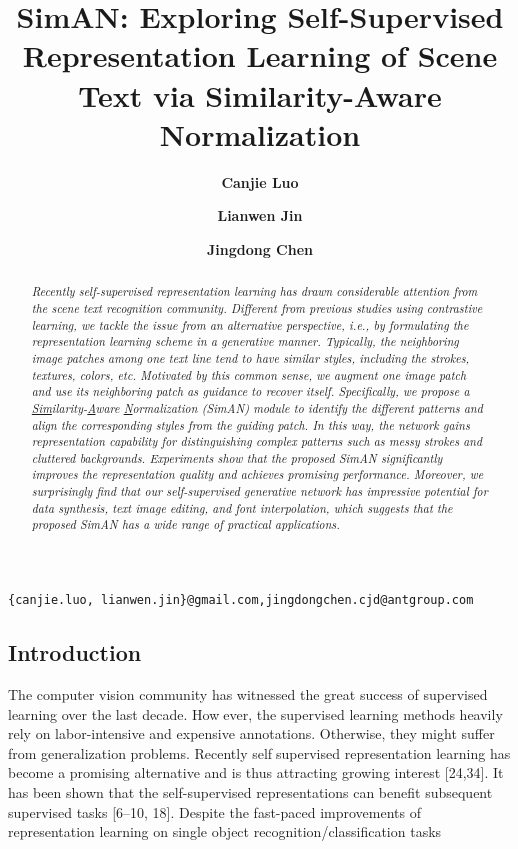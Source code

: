 \documentclass{article}
\title{\Large\textbf{SimAN: Exploring Self-Supervised Representation Learning of Scene Text
via Similarity-Aware Normalization}\\

}
\author[1]{\textbf{ Canjie Luo}}
\author[1,2,*]{\textbf{ Lianwen Jin} }
\author[3]{\textbf{Jingdong Chen}}
\affil[1]{South China University of Technology}
\affil[2]{Peng Cheng Laboratory}
\affil[3]{Ant Group}
\date{\vspace{-8ex}}
\begin{document}
\maketitle

\begin{center}
    \textmd{\texttt{\{canjie.luo, lianwen.jin\}@gmail.com,jingdongchen.cjd@antgroup.com}}
\end{center}


\begin{multicols}{2}

\begin{abstract}
\textit{Recently self-supervised representation learning has
drawn considerable attention from the scene text recognition community. Different from previous studies using contrastive learning, we tackle the issue from an alternative
perspective, i.e., by formulating the representation learning
scheme in a generative manner. Typically, the neighboring image patches among one text line tend to have similar styles, including the strokes, textures, colors, etc. Motivated by this common sense, we augment one image patch
and use its neighboring patch as guidance to recover itself.
Specifically, we propose a \underline{Sim}ilarity-\underline{A}ware \underline{N}ormalization
(SimAN) module to identify the different patterns and align
the corresponding styles from the guiding patch. In this
way, the network gains representation capability for distinguishing complex patterns such as messy strokes and cluttered backgrounds. Experiments show that the proposed
SimAN significantly improves the representation quality and
achieves promising performance. Moreover, we surprisingly find that our self-supervised generative network has
impressive potential for data synthesis, text image editing,
and font interpolation, which suggests that the proposed
SimAN has a wide range of practical applications.}
\end{abstract}

\section{Introduction}

The computer vision community has witnessed the great
success of supervised learning over the last decade. However, the supervised learning methods heavily rely on
labor-intensive and expensive annotations. Otherwise, they
might suffer from generalization problems. Recently selfsupervised representation learning has become a promising
alternative and is thus attracting growing interest [24,34]. It
has been shown that the self-supervised representations can
benefit subsequent supervised tasks [6–10, 18].
Despite the fast-paced improvements of representation
learning on single object recognition/classification tasks


\end{multicols}
\end{document}
